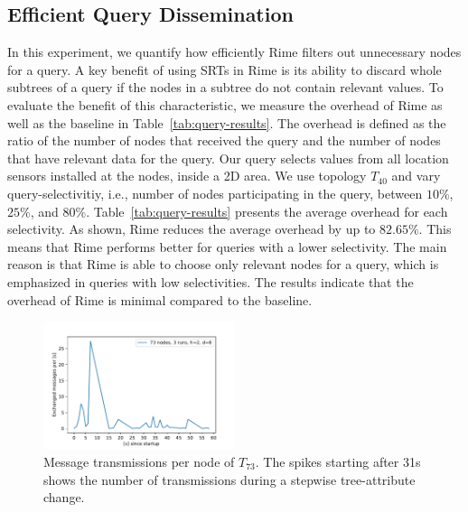 \subsection{Efficient Query Dissemination}
\label{sec:evaluation-query-dissemination}
% 
In this experiment, we quantify how efficiently Rime filters out unnecessary nodes for a query. A key benefit of using SRTs in Rime is its ability to discard whole subtrees of a query if the nodes in a subtree do not contain relevant values. 
To evaluate the benefit of this characteristic, we measure the overhead of Rime as well as the baseline in Table~\ref{tab:query-results}. The overhead is defined as the ratio of the number of nodes that received the query and the number of nodes that have relevant data for the query.
% 
Our query selects values from all location sensors installed at the nodes, inside a 2D area. 
We use topology $T_{40}$ and vary query-selectivitiy, i.e., number of nodes participating in the query, between $10\%$, $25\%$, and $80\%$. 
Table~\ref{tab:query-results} presents the average overhead for each selectivity.
As shown, Rime reduces the average overhead by up to $82.65\%$. This means that Rime performs better for queries with a lower selectivity. The main reason is that Rime is able to choose only relevant nodes for a query, which is emphasized in queries with low selectivities. The results indicate that the overhead of Rime is minimal compared to the baseline.

\begin{figure}[t]
  \centering
  \includegraphics[width=0.5\textwidth]{img/evaluation/vliot/movement-avg-msgs-per-node-73.pdf}
  \caption{Message transmissions per node of $T_{73}$. The spikes starting after 31s shows the number of transmissions during a stepwise tree-attribute change.}
  \label{fig:movement-avg-per-node}
\end{figure} 

